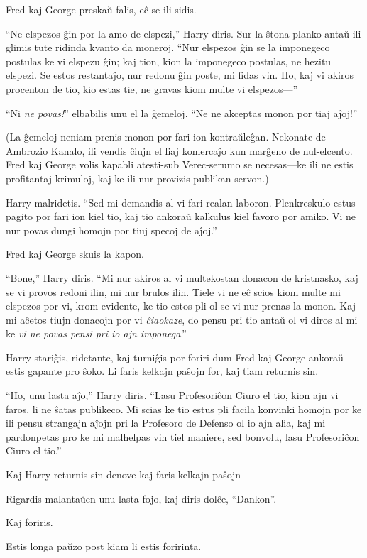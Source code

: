 Fred kaj George preskaŭ falis, eĉ se ili sidis.

``Ne elspezos ĝin por la amo de elspezi,'' Harry diris. Sur la ŝtona
planko antaŭ ili glimis tute ridinda kvanto da moneroj. ``Nur elspezos
ĝin se la imponegeco postulas ke vi elspezu ĝin; kaj tion, kion la
imponegeco postulas, ne hezitu elspezi. Se estos restantaĵo, nur
redonu ĝin poste, mi fidas vin. Ho, kaj vi akiros procenton de tio,
kio estas tie, ne gravas kiom multe vi elspezos—''

``Ni \emph{ne povas!}'' elbabilis unu el la ĝemeloj. ``Ne ne akceptas monon por tiaj aĵoj!''

(La ĝemeloj neniam prenis monon por fari ion kontraŭleĝan. Nekonate de
Ambrozio Kanalo, ili vendis ĉiujn el liaj komercaĵo kun marĝeno de
nul-elcento. Fred kaj George volis kapabli atesti-sub Verec-serumo se
necesas—ke ili ne estis profitantaj krimuloj, kaj ke ili nur provizis
publikan servon.)

Harry malridetis. ``Sed mi demandis al vi fari realan
laboron. Plenkreskulo estus pagito por fari ion kiel tio, kaj tio
ankoraŭ kalkulus kiel favoro por amiko. Vi ne nur povas dungi homojn
por tiuj specoj de aĵoj.''

Fred kaj George skuis la kapon.

``Bone,'' Harry diris. ``Mi nur akiros al vi multekostan donacon de
kristnasko, kaj se vi provos redoni ilin, mi nur brulos ilin. Tiele vi
ne eĉ scios kiom multe mi elspezos por vi, krom evidente, ke tio estos
pli ol se vi nur prenas la monon. Kaj mi aĉetos tiujn donacojn por vi
\emph{ĉiaokaze}, do pensu pri tio antaŭ ol vi diros al mi ke \emph{vi
  ne povas pensi pri io ajn imponega}.''

Harry stariĝis, ridetante, kaj turniĝis por foriri dum Fred kaj George ankoraŭ estis gapante pro ŝoko. Li faris kelkajn paŝojn for, kaj tiam returnis sin.

``Ho, unu lasta aĵo,'' Harry diris. ``Lasu Profesoriĉon Ciuro el tio,
kion ajn vi faros. li ne ŝatas publikeco. Mi scias ke tio estus pli
facila konvinki homojn por ke ili pensu strangajn aĵojn pri la
Profesoro de Defenso ol io ajn alia, kaj mi pardonpetas pro ke mi
malhelpas vin tiel maniere, sed bonvolu, lasu Profesoriĉon Ciuro el tio.''

Kaj Harry returnis sin denove kaj faris kelkajn paŝojn— 

Rigardis malantaŭen unu lasta fojo, kaj diris dolĉe, ``Dankon''.

Kaj foriris.

Estis longa paŭzo post kiam li estis foririnta.

